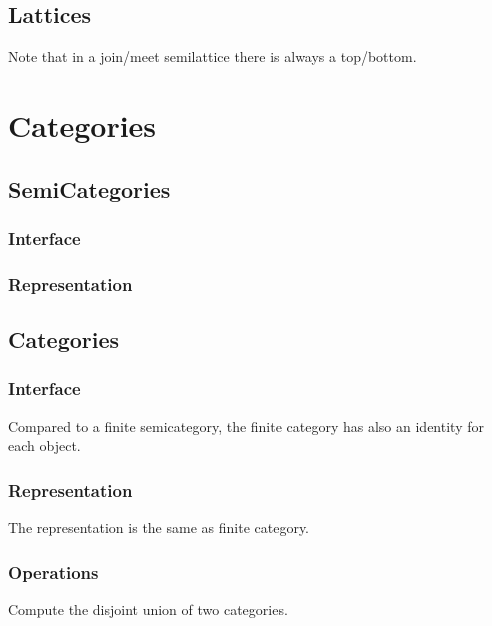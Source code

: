 \section{Lattices}





Note that in a join/meet semilattice there is always a top/bottom.


\chapter{Categories}


\section{SemiCategories}
\subsection*{Interface}

\subsection*{Representation}


\section{Categories}
\subsection*{Interface}
Compared to a finite semicategory, the finite category
has also an identity for each object.

\subsection*{Representation}

The representation is the same as finite category.

\subsection*{Operations}

\begin{gradedexercise}
Compute the disjoint union of two categories.

\end{gradedexercise}


